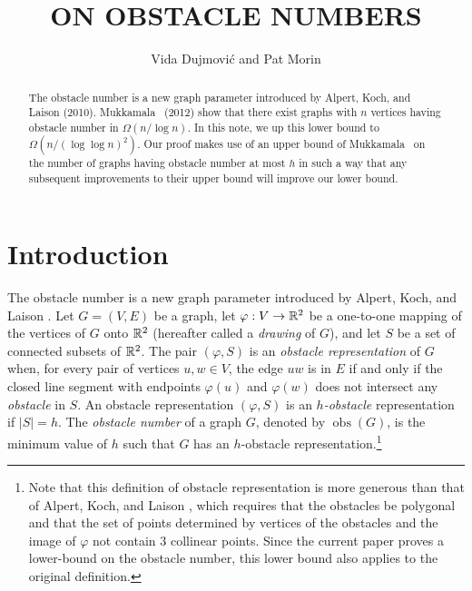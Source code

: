 \documentclass{patmorin}
\title{\MakeUppercase{On Obstacle Numbers}}
\author{Vida Dujmovi\'c and Pat Morin}
\DeclareMathOperator{\obs}{obs}
\begin{document}
\begin{titlepage}
\maketitle

\begin{abstract}
\setlength{\baselineskip}{16.8pt}
The obstacle number is a new graph parameter introduced by Alpert, Koch,
and Laison (2010).  Mukkamala \etal\ (2012) show that there exist graphs
with $n$ vertices having obstacle number in $\Omega(n/\log n)$. In this
note, we up this lower bound to $\Omega(n/(\log\log n)^2)$.  Our proof
makes use of an upper bound of Mukkamala \etal\ on the number of graphs
having obstacle number at most $h$ in such a way that any subsequent
improvements to their upper bound will improve our lower bound.
\end{abstract}
\end{titlepage}


\section{Introduction}

\setlength{\baselineskip}{16.8pt}
The obstacle number is a new graph parameter introduced by Alpert, Koch,
and Laison \cite{alpert.koch.ea:obstacle}.  Let $G=(V,E)$ be a graph,
let $\varphi:V\to \mathbb{R}^2$ be a one-to-one mapping of the vertices of
$G$ onto $\mathbb{R}^2$ (hereafter called a \emph{drawing} of $G$), and let $S$
be a set of connected subsets of $\mathbb{R}^2$.  The pair $(\varphi,S)$ is an
\emph{obstacle representation} of $G$ when, for every pair of vertices
$u,w\in V$, the edge $uw$ is in $E$ if and only if the closed line
segment with endpoints $\varphi(u)$ and $\varphi(w)$ does not intersect
any \emph{obstacle} in $S$.  An obstacle representation $(\varphi,S)$
is an \emph{$h$-obstacle} representation if $|S|=h$.  The \emph{obstacle
number} of a graph $G$, denoted by $\obs(G)$, is the minimum value of $h$
such that $G$ has an $h$-obstacle representation.\footnote{Note that
this definition of obstacle representation is more generous than that of Alpert, Koch, and Laison \cite{alpert.koch.ea:obstacle}, which requires that the obstacles be polygonal and that the
set of points determined by vertices of the obstacles and the image of $\varphi$ not contain 3 collinear points. Since the current
paper proves a lower-bound on the obstacle number, this lower bound
also applies to the original definition.}
\note{Changed $w(n)$ to $\obs(n)$}
\end{document}
